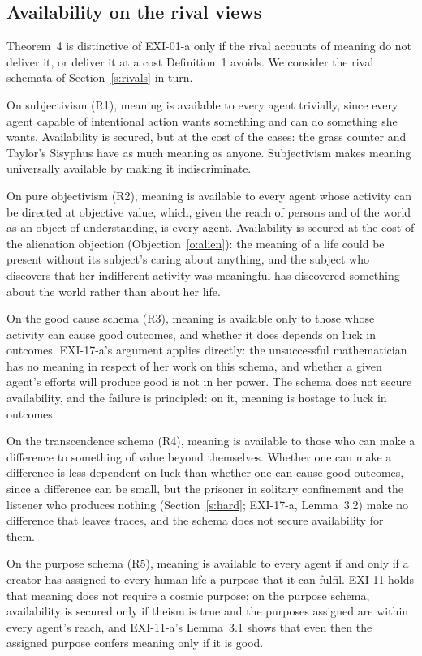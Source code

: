 \subsection{Availability on the rival views}\label{s:availrivals}

Theorem~4 is distinctive of EXI-01-a only if the rival accounts of meaning do not deliver it, or deliver it at a cost Definition~1 avoids. We consider the rival schemata of Section~\ref{s:rivals} in turn.

On subjectivism (R1), meaning is available to every agent trivially, since every agent capable of intentional action wants something and can do something she wants. Availability is secured, but at the cost of the cases: the grass counter and Taylor's Sisyphus have as much meaning as anyone. Subjectivism makes meaning universally available by making it indiscriminate.

On pure objectivism (R2), meaning is available to every agent whose activity can be directed at objective value, which, given the reach of persons and of the world as an object of understanding, is every agent. Availability is secured at the cost of the alienation objection (Objection~\ref{o:alien}): the meaning of a life could be present without its subject's caring about anything, and the subject who discovers that her indifferent activity was meaningful has discovered something about the world rather than about her life.

On the good cause schema (R3), meaning is available only to those whose activity can cause good outcomes, and whether it does depends on luck in outcomes. EXI-17-a's argument applies directly: the unsuccessful mathematician has no meaning in respect of her work on this schema, and whether a given agent's efforts will produce good is not in her power. The schema does not secure availability, and the failure is principled: on it, meaning is hostage to luck in outcomes.

On the transcendence schema (R4), meaning is available to those who can make a difference to something of value beyond themselves. Whether one can make a difference is less dependent on luck than whether one can cause good outcomes, since a difference can be small, but the prisoner in solitary confinement and the listener who produces nothing (Section~\ref{s:hard}; EXI-17-a, Lemma~3.2) make no difference that leaves traces, and the schema does not secure availability for them.

On the purpose schema (R5), meaning is available to every agent if and only if a creator has assigned to every human life a purpose that it can fulfil. EXI-11 holds that meaning does not require a cosmic purpose; on the purpose schema, availability is secured only if theism is true and the purposes assigned are within every agent's reach, and EXI-11-a's Lemma~3.1 shows that even then the assigned purpose confers meaning only if it is good.

